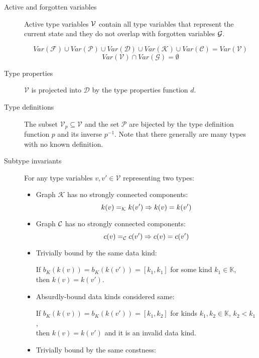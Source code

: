 \begin{description}
    \item[Active and forgotten variables]
    Active type variables $\mathcal V$ contain all type variables that represent the current state and they do not overlap with forgotten variables $\mathcal G$.

    $$Var(\mathcal{F}) \cup Var(\mathcal{P}) \cup Var(\mathcal{D}) \cup Var(\mathcal{K}) \cup Var(\mathcal{C}) = Var(\mathcal{V})$$ $$Var(\mathcal{V}) \cap Var(\mathcal{G}) = \emptyset$$

    \item[Type properties] $\mathcal{V}$ is projected into $\mathcal{D}$  by the type properties function $d$.

    \item[Type definitions] The subset $\mathcal{V}_p \subseteq \mathcal{V}$ and the set $\mathcal{P}$ are bijected by the type definition function $p$ and its inverse $p^{-1}$. Note that there generally are many types with no known definition.

    \item[Subtype invariants] For any type variables $v, v' \in \mathcal{V}$ representing two types:
        \begin{itemize}
            \item Graph $\mathcal{K}$ has no strongly connected components:
            $$k (v) =_{\mathcal{K}} k (v') \Rightarrow k (v) = k(v')$$

            \item Graph $\mathcal C$ has no strongly connected components:
            $$c (v) =_{\mathcal{C}} c (v') \Rightarrow c (v) = c(v')$$

            \item Trivially bound by the same data kind:

            If $b_K (k (v)) = b_K (k (v')) = [k_1, k_1]$ for some kind $k_1 \in \mathbb{K}$, \\
            then $k (v) = k (v')$.

            \item Absurdly-bound data kinds considered same:

            If $b_K (k (v)) = b_K (k (v')) = [k_1, k_2]$ for kinds $k_1, k_2 \in \mathbb{K}$, $k_2 < k_1$, \\
            then $k (v) = k (v')$ and it is an invalid data kind.

            \item Trivially bound by the same constness:


\end{itemize}
\end{description}
